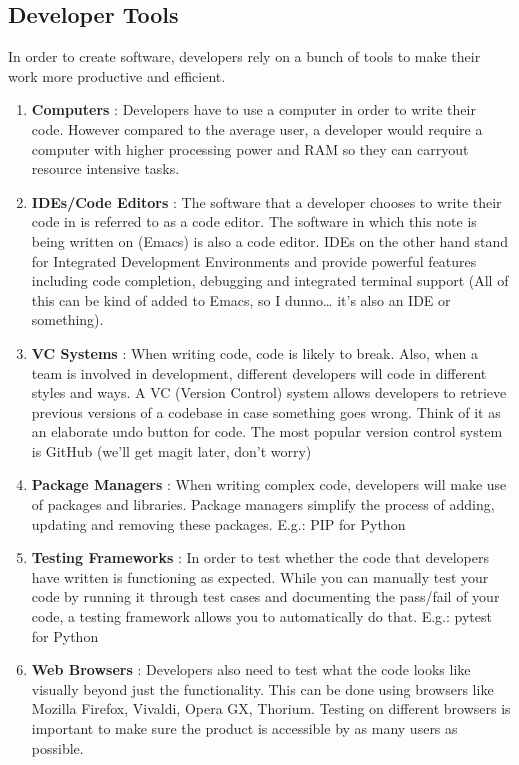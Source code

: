 \documentclass[11pt]{article}
\begin{document}
\subsection{Developer Tools}
\label{sec:org4f7f029}
In order to create software, developers rely on a bunch of tools to make their work more productive
and efficient.
\begin{enumerate}
\item \textbf{Computers} : Developers have to use a computer in order to write their code. However compared to
the average user, a developer would require a computer with higher processing power and RAM so
they can carryout resource intensive tasks.
\item \textbf{IDEs/Code Editors} : The software that a developer chooses to write their code in is referred to
as a code editor. The software in which this note is being written on (Emacs) is also a code
editor. IDEs on the other hand stand for Integrated Development Environments and provide powerful
features including code completion, debugging and integrated terminal support (All of this can be
kind of added to Emacs, so I dunno\ldots{} it's also an IDE or something).
\item \textbf{VC Systems} : When writing code, code is likely to break. Also, when a team is involved in
development, different developers will code in different styles and ways. A VC (Version Control)
system allows developers to retrieve previous versions of a codebase in case something goes
wrong. Think of it as an elaborate undo button for code. The most popular version control system
is GitHub (we'll get magit later, don't worry)
\item \textbf{Package Managers} : When writing complex code, developers will make use of packages and
libraries. Package managers simplify the process of adding, updating and removing these packages.
E.g.: PIP for Python
\item \textbf{Testing Frameworks} : In order to test whether the code that developers have written is
functioning as expected. While you can manually test your code by running it through test cases
and documenting the pass/fail of your code, a testing framework allows you to automatically do
that.
E.g.: pytest for Python
\item \textbf{Web Browsers} : Developers also need to test what the code looks like visually beyond just the
functionality. This can be done using browsers like Mozilla Firefox, Vivaldi, Opera GX,
Thorium. Testing on different browsers is important to make sure the product is accessible by as
many users as possible.
\end{enumerate}
\end{document}
